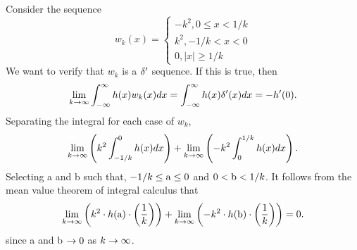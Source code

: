\begin{example}
    Consider the sequence 
    \begin{equation}\label{ex:ds1}
        w_k(x) = \begin{cases}
            -k^2, 0\leq x < 1/k\\
            k^2, -1/k < x < 0\\
            0, |x| \geq 1/k
        \end{cases}
    \end{equation}
    We want to verify that \(w_k\) is a \(\delta '\) sequence. If this is true, then
    \begin{equation}
        \lim_{k\-> \inf} \intR h(x) w_k(x) dx = \intR h(x)\d ' (x) dx = -h'(0).
    \end{equation}
    Separating the integral for each case of \(w_k\),
    \begin{equation}
        \lim_{k\-> \inf} \left( k^2 \int_{-1/k}^0 h(x) dx \right) + \lim_{k\-> \inf} \left( -k^2 \int_0^{1/k} h(x)dx \right) .
    \end{equation}
    Selecting a and b such that, \(-1/k \leq \mathrm{a} \leq 0 \) and \(0 < \mathrm{b} < 1/k\). It follows from the mean value theorem of integral calculus that 
    \begin{equation}
        \lim_{k\-> \inf} \left( k^2 \cdot h(\lima) \cdot \left(\frac{1}{k}\right) \right) + \lim_{k\-> \inf} \left( -k^2 \cdot h(\limb) \cdot \left(\frac{1}{k}\right)\right) = 0.
    \end{equation}
    since a and b \(\-> 0\) as \(k \-> \inf\).
    \begin{figure}
        \centering
\end{figure}
\end{example}
